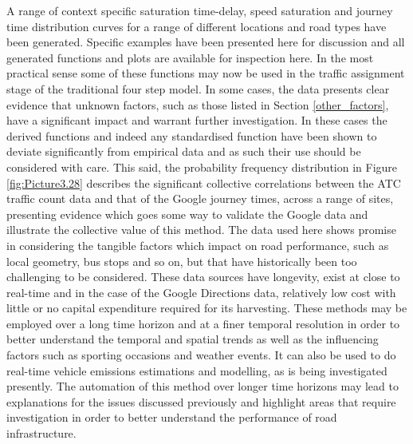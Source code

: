 \documentclass{CUP-JNL-DCE}
\begin{document}
A range of context specific saturation time-delay, speed saturation and journey time distribution curves for a range of different locations and road types have been generated. Specific examples have been presented here for discussion and all generated functions and plots are available for inspection here. In the most practical sense some of these functions may now be used in the traffic assignment stage of the traditional four step model. In some cases, the data presents clear evidence that unknown factors, such as those listed in Section \ref{other_factors}, have a significant impact and warrant further investigation. In these cases the derived functions and indeed any standardised function have been shown to deviate significantly from empirical data and as such their use should be considered with care. This said, the probability frequency distribution in Figure \ref{fig:Picture3.28} describes the significant collective correlations between the ATC traffic count data and that of the Google journey times, across a range of sites, presenting evidence which goes some way to validate the Google data and illustrate the collective value of this method. The data used here shows promise in considering the tangible factors which impact on road performance, such as local geometry, bus stops and so on, but that have historically been too challenging to be considered. These data sources have longevity, exist at close to real-time and in the case of the Google Directions data, relatively low cost with little or no capital expenditure required for its harvesting. These methods may be employed over a long time horizon and at a finer temporal resolution in order to better understand the temporal and spatial trends as well as the influencing factors such as sporting occasions and weather events. It can also be used to do real-time vehicle emissions estimations and modelling, as is being investigated presently. The automation of this method over longer time horizons may lead to explanations for the issues discussed previously and highlight areas that require investigation in order to better understand the performance of road infrastructure.
\end{document}
